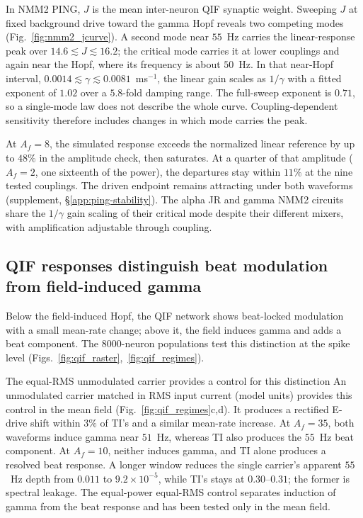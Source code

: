 \documentclass[11pt,a4paper]{article}
\providecommand{\DIFaddtex}[1]{{\protect\color{blue} \sf #1}} %
\providecommand{\DIFdeltex}[1]{{\protect\color{red} \scriptsize #1}} %
\providecommand{\DIFaddbegin}{} %
\providecommand{\DIFaddend}{} %
\providecommand{\DIFdelbegin}{} %
\providecommand{\DIFdelend}{} %
\providecommand{\DIFadd}[1]{\texorpdfstring{\DIFaddtex{#1}}{#1}} %
\providecommand{\DIFdel}[1]{\texorpdfstring{\DIFdeltex{#1}}{}} %
\begin{document}
In NMM2 PING, $J$ is the mean inter-neuron QIF synaptic weight.
Sweeping $J$ at fixed background drive toward the gamma Hopf reveals two
competing modes (Fig.~\ref{fig:nmm2_jcurve}). A second mode near $55$~Hz carries
the linear-response peak over $14.6\lesssim J\lesssim16.2$; the critical mode
carries it at lower couplings and again near the Hopf, where its frequency is
about $50$~Hz. In that near-Hopf interval,
$0.0014\lesssim\gamma\lesssim0.0081$~ms$^{-1}$, the linear gain scales as
$1/\gamma$ with a fitted exponent of $1.02$ over a $5.8$-fold damping range.
The full-sweep exponent is $0.71$, so a single-mode law does not describe the
whole curve. Coupling-dependent sensitivity \cite{clusella2023} therefore
includes changes in which mode carries the peak.

At $A_f=8$, the simulated response exceeds the normalized linear reference by
up to $48\%$ in the amplitude check, then saturates. At a quarter of that
amplitude ($A_f=2$, one sixteenth of the power), the departures stay within
$11\%$ at the nine tested couplings. The driven endpoint remains attracting under both waveforms
(supplement, \S\ref{app:ping-stability}).
The alpha JR and gamma NMM2 circuits share the $1/\gamma$ gain scaling of their critical mode despite their different
mixers, with amplification adjustable through coupling.

\subsection{QIF responses distinguish beat modulation from field-induced gamma}\label{sec:qif}
Below the field-induced Hopf, the QIF network shows beat-locked modulation with
a small mean-rate change; above it, the field induces gamma and adds a beat
component. The $8000$-neuron populations test this distinction at the spike level
\cite{montbrio2015,ruffini2025rosetta,clusella2023}
(Figs.~\ref{fig:qif_raster},~\ref{fig:qif_regimes}).

\DIFdelbegin \DIFdel{The equal-RMS unmodulated carrier provides a control for this distinction }\DIFdelend \DIFaddbegin \DIFadd{An unmodulated carrier matched in RMS input current (model units)
provides this control }\DIFaddend in the mean field (Fig.~\ref{fig:qif_regimes}c,d). It produces a rectified E-drive
shift within $3\%$ of TI's and a similar mean-rate increase. At $A_f=35$, both
waveforms induce gamma near $51$~Hz, whereas TI also produces the $55$~Hz beat
component. At $A_f=10$, neither induces gamma, and TI alone produces a resolved beat
response. A longer window reduces the single carrier's apparent $55$~Hz
depth from $0.011$ to $9.2\times10^{-5}$, while TI's stays at $0.30$--$0.31$;
the former is spectral leakage. The \DIFdelbegin \DIFdel{equal-power }\DIFdelend \DIFaddbegin \DIFadd{equal-RMS }\DIFaddend control separates induction
of gamma from the beat response and has been tested only in the mean field.
\end{document}

